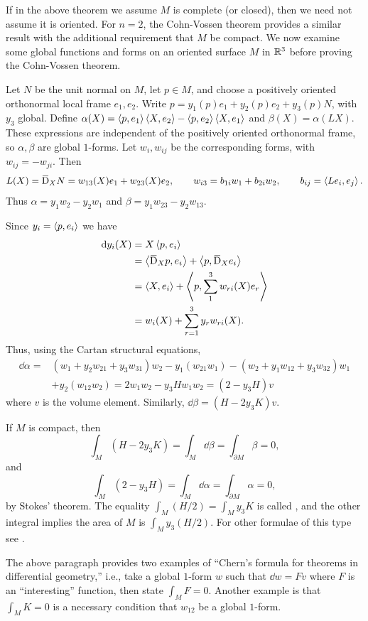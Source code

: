 \documentclass[../main]{subfiles}
\begin{document}
If in the above theorem we assume $M$ is complete (or closed), then we need not assume it is oriented. For $n=2$, the Cohn-Vossen theorem provides a similar result with the additional requirement that $M$ be compact. We now examine some global functions and forms on an oriented surface $M$ in $\mathbb{R}^3$ before proving the Cohn-Vossen theorem.

Let $N$ be the unit normal on $M$, let $p\in M$, and choose a positively oriented orthonormal local frame $e_1,e_2$. Write $p=y_1(p)e_1+y_2(p)e_2+y_3(p)N$, with $y_3$ global. Define $\alpha(X)=\left\langle p,e_1\right\rangle\left\langle X,e_2\right\rangle-\left\langle p,e_2\right\rangle\left\langle X,e_1\right\rangle$ and $\beta(X)=\alpha(LX)$. These expressions are independent of the positively oriented orthonormal frame, so $\alpha,\beta$ are global $1$-forms. Let $w_i,w_{ij}$ be the corresponding forms, with $w_{ij}=-w_{ji}$. Then
\[L(X)=\covariant_XN=w_{13}(X)e_1+w_{23}(X)e_2,\qquad w_{i3}=b_{1i}w_1+b_{2i}w_2,\qquad b_{ij}=\ip{Le_i}{e_j}.\]
Thus $\alpha=y_1w_2-y_2w_1$ and $\beta=y_1w_{23}-y_2w_{13}$.

Since $y_i=\left\langle p,e_i\right\rangle$ we have 
\begin{align*}
  \dd y_i(X)&=X\ip{p}{e_i}\\
  &=\ip{\covariant_Xp}{e_i}+\ip{p}{\covariant_Xe_i}\\
  &=\ip{X}{e_i}+\ip{p}{\sum_1^3w_{r i}(X)e_r}\\
  &=w_i(X)+\sum_{r=1}^3 y_r w_{r i}(X). 
\end{align*}
Thus, using the Cartan structural equations,
\begin{align*}
    \dd\alpha=&(w_1+y_2 w_{21}+y_3 w_{31})w_2-y_1(w_{21}w_1)-(w_2+y_1w_{12}+y_3w_{32})w_1\\
    &+y_2(w_{12}w_2)=2 w_1 w_2-y_3Hw_1 w_2=(2-y_3 H) v
\end{align*}
where $v$ is the volume element. Similarly, $\dd\beta=(H-2y_3 K)v$.

If $M$ is compact, then \[\int_M(H-2 y_3K)=\int_M\dd\beta=\int_{\partial M} \beta=0,\] and \[\int_M(2-y_3H)=\int_M\dd\alpha=\int_{\partial M}\alpha=0,\] by Stokes' theorem. The equality $\int_M(H/2)=\int_My_3K$ is called , and the other integral implies the area of $M$ is $\int_My_3(H/2)$. For other formulae of this type see \cite{Bonnesen1974theorie}.

The above paragraph provides two examples of ``Chern's formula for theorems in differential geometry,'' i.e., take a global $1$-form $w$ such that $\dd w=Fv$ where $F$ is an ``interesting'' function, then state $\int_MF=0$. Another example is that $\int_M K=0$ is a necessary condition that $w_{12}$ be a global $1$-form.
\end{document}
